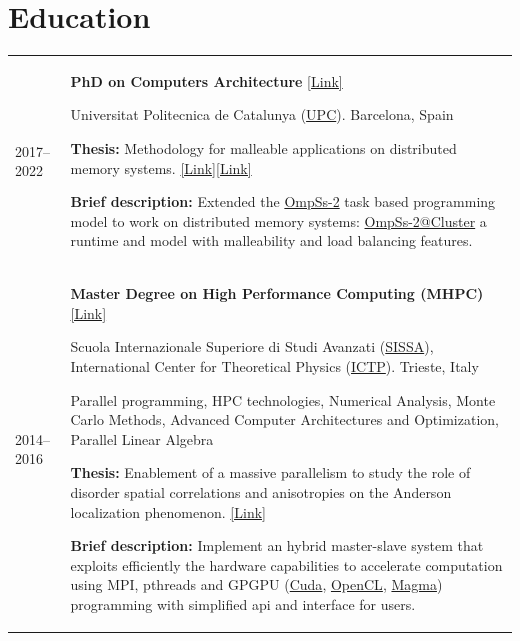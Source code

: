 \documentclass[a4paper,10pt]{article}
\begin{document}
\section{Education}
\begin{tabularx}{\linewidth}{@{}l X@{}}
  2017--2022 & \textbf{PhD on Computers Architecture}
               \href{https://www.ac.upc.edu/en/academics/ph-d/ph-d-programme-by-computer-architecture}{[Link]}

               Universitat Politecnica de Catalunya (\href{https://www.upc.edu/en}{UPC}).
               Barcelona, Spain

               \textbf{Thesis:} Methodology for malleable applications on distributed memory systems.
               \href{http://dx.doi.org/10.5821/dissertation-2117-380814}{[Link]}\href{https://upcommons.upc.edu/bitstream/handle/2117/380814/TJAM1de1.pdf}{[Link]}

               \textbf{Brief description:} Extended the \href{https://pm.bsc.es/ompss-2}{OmpSs-2} task based programming model to
               work on distributed memory systems: \href{https://github.com/bsc-pm/ompss-2-cluster-releases}{OmpSs-2@Cluster}
               a runtime and model with malleability and load balancing features.
  \\

  2014--2016 & \textbf{Master Degree on High Performance Computing (MHPC)} \href{http://www.mhpc.it}{[Link]}

               Scuola Internazionale Superiore di Studi Avanzati (\href{https://www.sissa.it/}{SISSA}),
               International Center for Theoretical Physics (\href{https://www.ictp.it/}{ICTP}).
               Trieste, Italy

               Parallel programming, HPC technologies, Numerical Analysis, Monte
               Carlo Methods, Advanced Computer Architectures and Optimization,
               Parallel Linear Algebra

               \textbf{Thesis:} Enablement of a massive parallelism to study the role of disorder
               spatial correlations and anisotropies on the Anderson localization phenomenon.
               \href{https://backend.mhpc.sissa.it/sites/default/files/2021-02/JimmyAguilarMena.pdf}{[Link]}

               \textbf{Brief description:} Implement an hybrid master-slave system that exploits efficiently
               the hardware capabilities to accelerate computation using MPI, pthreads and GPGPU
               (\href{https://developer.nvidia.com/cuda-zone}{Cuda},
               \href{https://www.khronos.org/api/opencl}{OpenCL},
               \href{https://icl.utk.edu/magma/}{Magma}) programming with
               simplified api and interface for users.
  \\
\end{tabularx}
\end{document}

